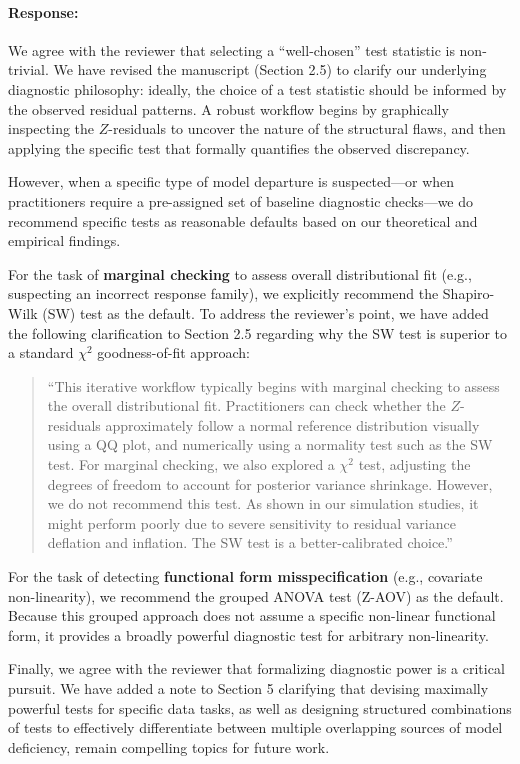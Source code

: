 \documentclass[11pt]{article}
\begin{document}
\paragraph{Response:}
We agree with the reviewer that selecting a ``well-chosen'' test statistic is non-trivial. We have revised the manuscript (Section 2.5) to clarify our underlying diagnostic philosophy: ideally, the choice of a test statistic should be informed by the observed residual patterns. A robust workflow begins by graphically inspecting the $Z$-residuals to uncover the nature of the structural flaws, and then applying the specific test that formally quantifies the observed discrepancy. 

However, when a specific type of model departure is suspected---or when practitioners require a pre-assigned set of baseline diagnostic checks---we do recommend specific tests as reasonable defaults based on our theoretical and empirical findings.

For the task of \textbf{marginal checking} to assess overall distributional fit (e.g., suspecting an incorrect response family), we explicitly recommend the Shapiro-Wilk (SW) test as the default. To address the reviewer's point, we have added the following clarification to Section 2.5 regarding why the SW test is superior to a standard $\chi^2$ goodness-of-fit approach:
\begin{quote}
``This iterative workflow typically begins with marginal checking to assess the overall distributional fit. Practitioners can check whether the $Z$-residuals approximately follow a normal reference distribution visually using a QQ plot, and numerically using a normality test such as the SW test. For marginal checking, we also explored a $\chi^2$ test, adjusting the degrees of freedom to account for posterior variance shrinkage. However, we do not recommend this test. As shown in our simulation studies, it might perform poorly due to severe sensitivity to residual variance deflation and inflation. The SW test is a better-calibrated choice.''
\end{quote}

For the task of detecting \textbf{functional form misspecification} (e.g., covariate non-linearity), we recommend the grouped ANOVA test (Z-AOV) as the default. Because this grouped approach does not assume a specific non-linear functional form, it provides a broadly powerful diagnostic test for arbitrary non-linearity. 

Finally, we agree with the reviewer that formalizing diagnostic power is a critical pursuit. We have added a note to Section 5 clarifying that devising maximally powerful tests for specific data tasks, as well as designing structured combinations of tests to effectively differentiate between multiple overlapping sources of model deficiency, remain compelling topics for future work.
\end{document}
